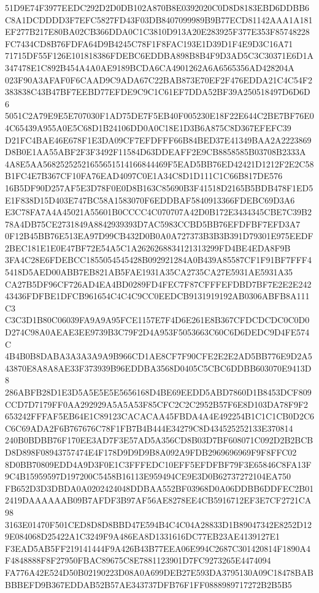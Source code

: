 \documentclass[UTF8,fontset=fandol,zihao=-4,a4paper]{ctexart}
\begin{document}
{{51D9E74F3977EEDC292D2D0DB102A870B8E0392020C0D8D8183EBD6DDBB6C8A1DCDDDD3F7EFC5827FD43F03DB8407099989B9B77ECD81142AAA1A181
EF277B217E80BA02CB366DDA0C1C3810D913A20E283925F377E353F85748228FC7434CD8B76FDFA64D9B4245C78F1F8FAC193E1D39D1F4E9D3C16A71
71715DF55F126E101818386FDEBC6EDDBA898B8B4F9D3AD5C3C30371E6D1A347478E1C892B454A4A0AE9189BCDA6CA4901262A6A6565356AD428204A
023F90A3AFAF0F6CAAD9C9ADA67C22BAB873E70EF2F476EDDA21C4C54F2383838C43B47BF7EEBD77EFDE9C9C1C61EF7DDA52BF39A250518497D6D6D6
5051C2A79E9E5E707030F1AD75DE7F5EB40F005230E18F22E644C2BE7BF76E04C65439A955A0E5C68D1B24106DD0A0C18E1D3B6A875C8D367EFEFC39
D21FC4BAE46E678F1E3DA09CF7EFDFFF66B84BED37E41349BAA2A2223869D8B0E1AA55ABF2F3F3492F11584D63DDEAFF2E9CB8858585B03708B2333A
4A8E5AA56825252521655651514166844469F5EAD5BB76ED42421D1212F2E2C58B1FC4E7B367CF10FA76EAD4097C0E1A34C8D1D111C1C66B817DE576
16B5DF90D257AF5E3D78F0E0D8B163C85690B3F41518D2165B5BDB478F1ED5E1F838D15D403E747BC58A1583070F6EDDBAF5840913366FDEBC69D3A6
E3C78FA7A4A45021A55601B0CCCC4C070707A42D0B172E3434345CBE7C39B278A4DB75CE2731849A8842939393D7AC5983CCBD5BB76EFDFBF7EFD3A7
0F12B45BB76E513EA97D99CB432D0B0A0A727373B3B3B391D79301E975EEDF2BEC181E1E0E47BF72E54A5C1A2626268834121313299FD4BE4EDA8F9B
3FA4C28E6FDEBCC1855054545428B092921284A0B439A85587CF1F91BF7FFF45418D5AED00ABB7EB821AB5FAE1931A35CA2735CA27E5931AE5931A35
CA27B5DF96CF726AD4EA4BD0289FD4FEC7F87CFFFEFDBD7BF7E2E2E24243436FDFBE1DFCB961654C4C4C9CC0EEDCB9131919192AB0306ABFB8A111C3
C3C3D1B80C06039FA9A9A95FCE1157E7F4D6E261E8B367CFDCDCDC0C0D0D274C98A0AEAE3EE9739B3C79F2D4A953F5053663C60C6D6DEDC9D4FE574C
4B4B0B8DABA3A3A3A9A9B966CD1AE8CF7F90CFE2E2E2AD5BB776E9D2A543870E8A8A8AE33F373939B96EDDBA3568D0405C5CBC6DDBB603070E9413D8
286ABFB28D1E3D5A5E5E5E5656168D4BE69EEDD5ABD7860D1B8453DCF809CCD7D7179FF0AA292929A5A5A53F85CFC2C2C2952B57F6E8D103DA78F9F2
653242FFFAF5EB64E1C89123CACACAA45FBDA4A4E492254B1C1C1CB0D2C6C6C69ADA2F6B767676C78F1FB7B4B444E34279C8D434525252133E370814
240B0BDBB76F170EE3AD7F3E57AD5A356CD8B03D7BF608071C092D2B2BCBD8D898F08943757474E4F178D9D9D9B8A092A9FDB2969696969F9F8FFC02
8D0BB70809EDD4A9D3F0E1C3FFFEDC10EFF5EFDFBF79F3E65846C8FA13F9C4B15959597D197200C5458B16113E959494CE9E3D0B62737272104EA750
FB652D3D3DBDA0A0202424048DDBAA552BF03968D0A06DDBB6DDFEC2B012419DAAAAAAB09B7AFDF3B97AF56AE8278EE4CB5916712EF3E7CF2721CA98
3163E01470F501CED8D8D8BBD47E594B4C4C04A28833D1B89047342E8252D129E084068D25422A1C3249F9A486EA8D1331616DC77EB23AE4139127E1
F3EAD5AB5FF219141444F9A426B43B77EEA06E994C2687C301420814F1890A4F4848888F8F27950FBAC89675C8E7881123901D7FC9273265E4474094
FA776A42E524D50B02190223D08A0A699DEB27E593DA3795130A09C18478BABBBBEFD9B367EDDAB52B57AE343737DFB76F1FF0888989717272B2B5B5
}}
\end{document}
